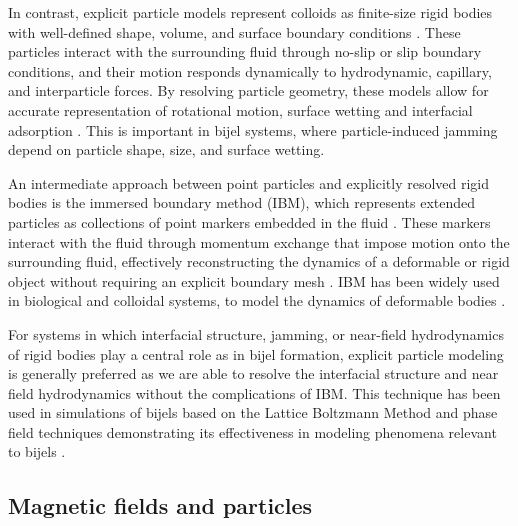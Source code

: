 In contrast, explicit particle models represent colloids as finite-size rigid bodies with well-defined shape, volume, and surface boundary conditions
\cite{ladd_numerical_1994, jansen_bijels_2011,gunther_timescales_2014}. These particles interact 
with the surrounding fluid through no-slip or slip boundary conditions, and their motion responds dynamically to hydrodynamic, capillary, and interparticle forces. By resolving 
particle geometry, these models allow for accurate representation of rotational motion, surface wetting and interfacial adsorption
\cite{jansen_bijels_2011, gunther_lattice_2013}.
This is important in bijel systems, where particle-induced jamming depend on particle shape, size, and surface wetting. 

An intermediate approach between point particles and explicitly resolved rigid bodies is the immersed boundary method (IBM), which represents extended particles as collections of 
point markers embedded in the fluid \cite{peskin_immersed_2002, luo_immersed-boundary_2008, spandan_parallel_2017}.
These markers interact with the fluid through momentum exchange that impose motion onto the surrounding fluid, effectively reconstructing 
the dynamics of a deformable or rigid object without requiring an explicit boundary mesh \cite{peskin_immersed_2002, luo_immersed-boundary_2008, spandan_parallel_2017}.
IBM has been widely used in biological and colloidal systems, to model the dynamics of deformable bodies \cite{peskin_immersed_2002, luo_immersed-boundary_2008, spandan_parallel_2017}.

For systems in which interfacial structure, jamming, or near-field hydrodynamics of rigid bodies play a central role as in bijel formation, explicit particle modeling 
is generally preferred as we are able to resolve the interfacial structure and near field hydrodynamics without the complications of IBM. This technique has been used in simulations of
bijels based on the Lattice Boltzmann Method and phase field techniques demonstrating its effectiveness in modeling
phenomena relevant to bijels \cite{jansen_bijels_2011,gunther_timescales_2014,carmack_tuning_2018}.

\subsection{Magnetic fields and particles}



